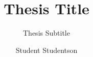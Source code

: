 
\title{Thesis Title}
\subtitle{Thesis Subtitle}

\subject{Dissertation of Student Studentson on some interesting research topic}

\author{Student Studentson}



